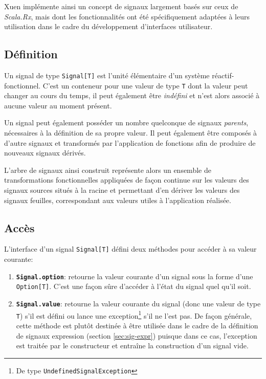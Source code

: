 Xuen implémente ainsi un concept de signaux largement basés sur ceux de \emph{Scala.Rx}, mais dont les fonctionnalités ont été spécifiquement adaptées à leurs utilisation dans le cadre du développement d'interfaces utilisateur.

\subsection{Définition}

Un signal de type \texttt{Signal[T]} est l'unité élémentaire d'un système réactif-fonctionnel. C'est un conteneur pour une valeur de type \texttt{T} dont la valeur peut changer au cours du temps, il peut également être \emph{indéfini} et n'est alors associé à aucune valeur au moment présent.

Un signal peut également posséder un nombre quelconque de signaux \emph{parents}, nécessaires à la définition de sa propre valeur. Il peut également être composés à d'autre signaux et transformés par l'application de fonctions afin de produire de nouveaux signaux dérivés.

L'arbre de signaux ainsi construit représente alors un ensemble de transformations fonctionnelles appliquées de façon continue sur les valeurs des signaux sources situés à la racine et permettant d'en dériver les valeurs des signaux feuilles, correspondant aux valeurs utiles à l'application réalisée.

\subsection{Accès}

L'interface d'un signal \texttt{Signal[T]} défini deux méthodes pour accéder à sa valeur courante:
\begin{enumerate}
	\item \textbf{\texttt{Signal.option}}: retourne la valeur courante d'un signal sous la forme d'une \texttt{Option[T]}. C'est une façon sûre d'accéder à l'état du signal quel qu'il soit.
	
	\item \textbf{\texttt{Signal.value}}: retourne la valeur courante du signal (donc une valeur de type \texttt{T}) s'il est défini ou lance une exception\footnote{De type \texttt{UndefinedSignalException}} s'il ne l'est pas. De façon générale, cette méthode est plutôt destinée à être utilisée dans le cadre de la définition de signaux expression (section \ref{sec:sig-expr}) puisque dans ce cas, l'exception est traitée par le constructeur et entraîne la construction d'un signal vide.
\end{enumerate}

